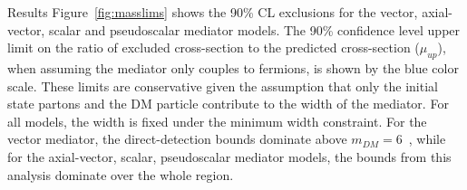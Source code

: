 \begin{section}{Results}
Figure~\ref{fig:masslims} shows the 90\% CL exclusions for the vector, axial-vector, 
scalar and pseudoscalar mediator models.  The 90\% confidence level upper limit on the ratio of excluded cross-section to the predicted cross-section ($\mu_{up}$), when assuming the mediator only 
couples to fermions, is shown by the blue color scale. These limits are conservative given the assumption that only the initial state partons and the DM 
particle contribute to the width of the mediator. For all models, the width is fixed under the minimum width constraint. For the vector 
mediator, the direct-detection bounds dominate above $m_{DM}=6$~\GeV, while for the axial-vector, scalar, pseudoscalar mediator models, the bounds 
from this analysis dominate over the whole region. 

\begin{figure}[htbp]
  \centering
  \\
\end{figure}
\end{section}

